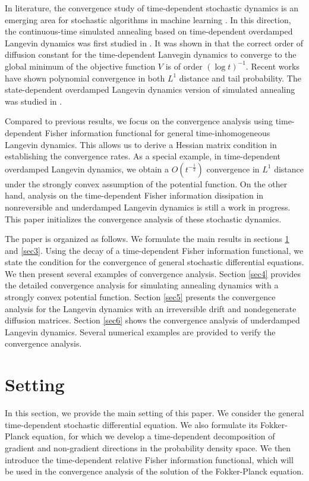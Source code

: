 \documentclass[11pt,reqno]{amsart}
\begin{document}
In literature, the convergence study of time-dependent stochastic dynamics is an emerging area for stochastic algorithms in machine learning \cite{Chizat2022}. In this direction, the continuous-time simulated annealing based on time-dependent overdamped Langevin dynamics was first studied in \cite{GH86}. It was shown in \cite{CH87,GH86} that the correct order of diffusion constant for the time-dependent Lanvegin dynamics to converge to the global minimum of the objective function $V$ is of order $(\log t)^{-1}$. Recent works \cite{Chizat2022, M18, MSTW18, TangZhou2021} have shown polynomial convergence in both $L^1$ distance and tail probability. The state-dependent overdamped Langevin dynamics version of simulated annealing was studied in \cite{FQG97, GXZ20}.

Compared to previous results, we focus on the convergence analysis using time-dependent Fisher information functional for general time-inhomogeneous Langevin dynamics. This allows us to derive a Hessian matrix condition in establishing the convergence rates. As a special example, in time-dependent overdamped Langevin dynamics, we obtain a $O(t^{-\frac{1}{2}})$ convergence in $L^1$ distance under the strongly convex assumption of the potential function. On the other hand, analysis on the time-dependent Fisher information dissipation in nonreversible and underdamped Langevin dynamics is still a work in progress. This paper initializes the convergence analysis of these stochastic dynamics.  

The paper is organized as follows. We formulate the main results in sections \ref{sec2} and \ref{sec3}. Using the decay of a time-dependent Fisher information functional, we state the condition for the convergence of general stochastic differential equations. We then present several examples of convergence analysis. Section \ref{sec4} provides the detailed convergence analysis for simulating annealing dynamics with a strongly convex potential function. Section \ref{sec5} presents the convergence analysis for the Langevin dynamics with an irreversible drift and nondegenerate diffusion matrices. Section \ref{sec6} shows the convergence analysis of underdamped Langevin dynamics. Several numerical examples are provided to verify the convergence analysis.  

\section{Setting}\label{sec2}
In this section, we provide the main setting of this paper. We consider the general time-dependent stochastic differential equation. We also formulate its Fokker-Planck equation, for which we develop a time-dependent decomposition of gradient and non-gradient directions in the probability density space. We then introduce the time-dependent relative Fisher information functional, which will be used in the convergence analysis of the solution of the Fokker-Planck equation.   
\end{document}
